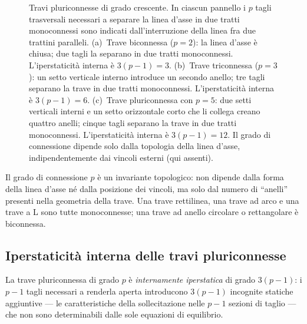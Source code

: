 \begin{figure}[!htbp]
{\begin{tikzpicture}[
			>=stealth, line width=0.8pt,
			trave/.style={line width=1.6pt, line cap=round,
				line join=round, black},
			taglio/.style={line width=0.7pt, black}]
		\end{tikzpicture}
	}
	\caption{Travi pluriconnesse di grado crescente. In
		ciascun pannello i $p$ tagli trasversali necessari
		a separare la linea d'asse in due tratti
		monoconnessi sono indicati dall'interruzione della
		linea fra due trattini paralleli.
		(a)~Trave biconnessa ($p = 2$): la linea
		d'asse è chiusa; due tagli la separano in due
		tratti monoconnessi. L'iperstaticità interna è
		$3(p-1) = 3$.
		(b)~Trave triconnessa ($p = 3$): un setto
		verticale interno introduce un secondo anello;
		tre tagli separano la trave in due tratti
		monoconnessi. L'iperstaticità interna è
		$3(p-1) = 6$.
		(c)~Trave pluriconnessa con $p = 5$: due setti
		verticali interni e un setto orizzontale corto
		che li collega creano quattro anelli; cinque
		tagli separano la trave in due tratti monoconnessi.
		L'iperstaticità interna è $3(p-1) = 12$.
		Il grado di connessione dipende solo dalla
		topologia della linea d'asse, indipendentemente
		dai vincoli esterni (qui assenti).}
	\label{fig:gradi_connessione}
\end{figure}




\begin{oss}
	Il grado di connessione $p$ è un invariante
	topologico: non dipende dalla forma della linea
	d'asse né dalla posizione dei vincoli, ma solo
	dal numero di ``anelli'' presenti nella geometria
	della trave. Una trave rettilinea, una trave
	ad arco e una trave a L sono tutte monoconnesse;
	una trave ad anello circolare o rettangolare è
	biconnessa.
\end{oss}

\subsection{Iperstaticità interna delle travi pluriconnesse}
\label{sec:ipestat_interna}

La trave pluriconnessa di grado $p$ è
\emph{internamente iperstatica} di grado $3(p-1)$:
i $p-1$ tagli necessari a renderla aperta
introducono $3(p-1)$ incognite statiche aggiuntive
--- le caratteristiche della sollecitazione nelle
$p-1$ sezioni di taglio --- che non sono
determinabili dalle sole equazioni di equilibrio.


